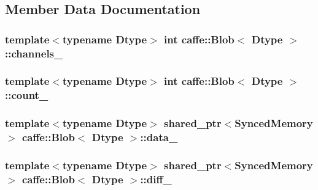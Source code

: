 \subsection{Member Data Documentation}
\hypertarget{classcaffe_1_1_blob_a7618f913659955dcee178c00a842065c}{
\subsubsection[{channels\+\_\+}]{\setlength{\rightskip}{0pt plus 5cm}template$<$typename Dtype$>$ int {\bf caffe\+::\+Blob}$<$ Dtype $>$\+::channels\+\_\+\hspace{0.3cm}{\ttfamily [protected]}}}\label{classcaffe_1_1_blob_a7618f913659955dcee178c00a842065c}
\hypertarget{classcaffe_1_1_blob_acf06ea13a3a14f77c178a525c35a3ea0}{
\subsubsection[{count\+\_\+}]{\setlength{\rightskip}{0pt plus 5cm}template$<$typename Dtype$>$ int {\bf caffe\+::\+Blob}$<$ Dtype $>$\+::count\+\_\+\hspace{0.3cm}{\ttfamily [protected]}}}\label{classcaffe_1_1_blob_acf06ea13a3a14f77c178a525c35a3ea0}
\hypertarget{classcaffe_1_1_blob_a5240277a3cea1bc530deca40ca0d0e16}{
\subsubsection[{data\+\_\+}]{\setlength{\rightskip}{0pt plus 5cm}template$<$typename Dtype$>$ shared\+\_\+ptr$<${\bf Synced\+Memory}$>$ {\bf caffe\+::\+Blob}$<$ Dtype $>$\+::data\+\_\+\hspace{0.3cm}{\ttfamily [protected]}}}\label{classcaffe_1_1_blob_a5240277a3cea1bc530deca40ca0d0e16}
\hypertarget{classcaffe_1_1_blob_a9310f9007aa45e529cb6d69d32dbb80c}{
\subsubsection[{diff\+\_\+}]{\setlength{\rightskip}{0pt plus 5cm}template$<$typename Dtype$>$ shared\+\_\+ptr$<${\bf Synced\+Memory}$>$ {\bf caffe\+::\+Blob}$<$ Dtype $>$\+::diff\+\_\+\hspace{0.3cm}{\ttfamily [protected]}}}\label{classcaffe_1_1_blob_a9310f9007aa45e529cb6d69d32dbb80c}
